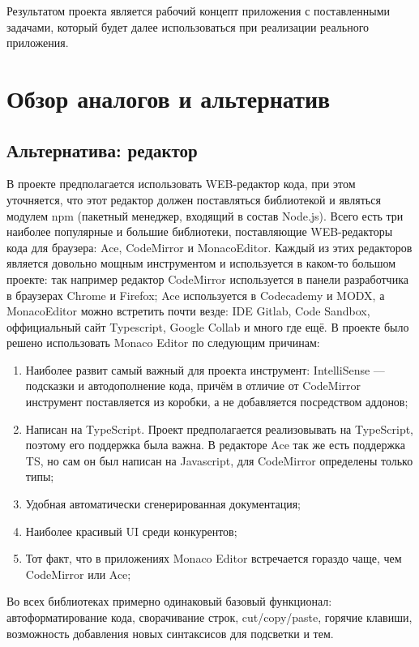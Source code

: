 \documentclass[12pt]{article}
\begin{document}
    Результатом проекта является рабочий концепт приложения с поставленными задачами, который будет далее использоваться при
    реализации реального приложения.
    \newpage


    \section{Обзор аналогов и альтернатив}

    \subsection{Альтернатива: редактор}
    В проекте предполагается использовать WEB-редактор кода, при этом уточняется, что этот редактор должен поставляться библиотекой
    и являться модулем npm (пакетный менеджер, входящий в состав Node.js). Всего есть три наиболее популярные и большие библиотеки,
    поставляющие WEB-редакторы кода для браузера:
    Ace, CodeMirror и MonacoEditor. Каждый из этих редакторов является довольно мощным инструментом и используется в каком-то большом
    проекте: так например редактор CodeMirror используется в панели разработчика в браузерах Chrome и Firefox; Ace используется в
    Codecademy и MODX, а MonacoEditor можно встретить почти везде: IDE Gitlab, Code Sandbox, оффициальный сайт Typescript, Google
    Collab и много где ещё. В проекте было решено использовать Monaco Editor по следующим причинам:
    \begin{enumerate}
        \item Наиболее развит самый важный для проекта инструмент: IntelliSense — подсказки и автодополнение кода, причём в отличие
        от CodeMirror инструмент поставляется из коробки, а не добавляется посредством аддонов;
        \item Написан на TypeScript. Проект предполагается реализовывать на TypeScript, поэтому его поддержка была важна. В редакторе
        Ace так же есть поддержка TS, но сам он был написан на Javascript, для CodeMirror определены только типы;
        \item Удобная автоматически сгенерированная документация;
        \item Наиболее красивый UI среди конкурентов;
        \item Тот факт, что в приложениях Monaco Editor встречается гораздо чаще, чем CodeMirror или Ace;
    \end{enumerate}

    Во всех библиотеках примерно одинаковый базовый функционал: автоформатирование кода, сворачивание строк, cut/copy/paste, горячие клавиши,
    возможность добавления новых синтаксисов для подсветки и тем.
\end{document}
